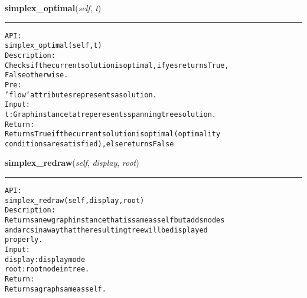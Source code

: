     \label{coinor:gimpy:graph:Graph:simplex_optimal}

    \vspace{0.5ex}

\hspace{.8\funcindent}\begin{boxedminipage}{\funcwidth}

    \raggedright \textbf{simplex\_optimal}(\textit{self}, \textit{t})

    \vspace{-1.5ex}

    \rule{\textwidth}{0.5\fboxrule}
\setlength{\parskip}{2ex}
\begin{alltt}

API:
    simplex\_optimal(self, t)
Description:
    Checks if the current solution is optimal, if yes returns True,
    False otherwise.
Pre:
    'flow' attributes represents a solution.
Input:
    t: Graph instance tat reperesents spanning tree solution.
Return:
    Returns True if the current solution is optimal (optimality
    conditions are satisfied), else returns False
\end{alltt}

\setlength{\parskip}{1ex}
    \end{boxedminipage}

    \label{coinor:gimpy:graph:Graph:simplex_redraw}

    \vspace{0.5ex}

\hspace{.8\funcindent}\begin{boxedminipage}{\funcwidth}

    \raggedright \textbf{simplex\_redraw}(\textit{self}, \textit{display}, \textit{root})

    \vspace{-1.5ex}

    \rule{\textwidth}{0.5\fboxrule}
\setlength{\parskip}{2ex}
\begin{alltt}

API:
    simplex\_redraw(self, display, root)
Description:
    Returns a new graph instance that is same as self but adds nodes
    and arcs in a way that the resulting tree will be displayed
    properly.
Input:
    display: display mode
    root: root node in tree.
Return:
    Returns a graph same as self.
\end{alltt}

\setlength{\parskip}{1ex}
    \end{boxedminipage}

